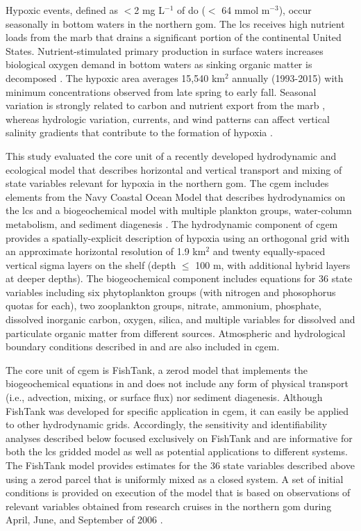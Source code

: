 \documentclass[letterpaper,12pt,oneside]{article}\usepackage[]{graphicx}\usepackage[]{color}
\begin{document}
Hypoxic events, defined  as $<$2 mg L$^{-1}$ of \ac{do} ($<$ 64 mmol m$^{-3}$), occur seasonally in bottom waters in the northern \ac{gom}.  The \ac{lcs} receives high nutrient loads from the \ac{marb} that drains a significant portion of the continental United States.  Nutrient-stimulated primary production in surface waters increases biological oxygen demand in bottom waters as sinking organic matter is decomposed \citep{Bierman94,Murrell13}.  The hypoxic area averages 15,540 km$^2$ annually (1993-2015) with minimum concentrations observed from late spring to early fall.  Seasonal variation is strongly related to carbon and nutrient export from the \ac{marb} \citep{Lohrenz08,Bianchi10}, whereas hydrologic variation, currents, and wind patterns can affect vertical salinity gradients that contribute to the formation of hypoxia \citep{Wiseman97,Paerl98,Obenour15}. 

This study evaluated the core unit of a recently developed hydrodynamic and ecological model that describes horizontal and vertical transport and mixing of state variables relevant for hypoxia in the northern \ac{gom}.  The \ac{cgem} includes elements from the Navy Coastal Ocean Model \citep{Martin00} that describes hydrodynamics on the \ac{lcs} and a biogeochemical model with multiple plankton groups, water-column metabolism, and sediment diagenesis \citep{Eldridge10}.  The hydrodynamic component of \ac{cgem} provides a spatially-explicit description of hypoxia using an orthogonal grid with an approximate horizontal resolution of 1.9 km$^2$ and twenty equally-spaced vertical sigma layers on the shelf (depth $\leq$ 100 m, with additional hybrid layers at deeper depths).  The biogeochemical component includes equations for 36 state variables including six phytoplankton groups (with nitrogen and phosophorus quotas for each), two zooplankton groups, nitrate, ammonium, phosphate, dissolved inorganic carbon, oxygen, silica, and multiple variables for dissolved and particulate organic matter from different sources.  Atmospheric and hydrological boundary conditions described in \citet{Hodur97} and \citet{Lehrter13} are also included in \ac{cgem}.

The core unit of \ac{cgem} is FishTank, a \ac{zerod} model that implements the biogeochemical equations in \citet{Eldridge10} and does not include any form of physical transport (i.e., advection, mixing, or surface flux) nor sediment diagenesis.  Although FishTank was developed for specific application in \ac{cgem}, it can easily be applied to other hydrodynamic grids. Accordingly, the sensitivity and identifiability analyses described below focused exclusively on FishTank and are informative for both the \ac{lcs} gridded model as well as potential applications to different systems.  The FishTank model provides estimates for the 36 state variables described above using a \ac{zerod} parcel that is uniformly mixed as a closed system.  A set of initial conditions is provided on execution of the model that is based on observations of relevant variables obtained from research cruises in the northern \ac{gom} during April, June, and September of 2006 \citep[Table 1 in][]{Murrell14}. 
\end{document}
